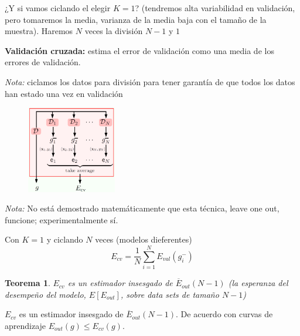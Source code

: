 \documentclass[11pt,a4paper]{article}
\newtheorem{theorem}{Teorema}
\theoremstyle{definition}
\begin{document}
	¿Y si vamos ciclando el elegir $K=1$? (tendremos alta variabilidad en validación, pero tomaremos la media, varianza de la media baja con el tamaño de la muestra). Haremos $N$ veces la división $N-1$ y $1$
	
	\textbf{Validación cruzada:} estima el error de validación como una media de los errores de validación.
	
	\textit{Nota:} ciclamos los datos para división para tener garantía de que todos los datos han estado una vez en validación
	
	\begin{figure}[H]
		\centering
		\includegraphics[width=0.35\textwidth]{images/leave_one_out}
		\caption{}
	\end{figure}
	\textit{Nota:} No está demostrado matemáticamente que esta técnica, leave one out, funcione; experimentalmente sí.
	
	Con $K=1$ y ciclando $N$ veces (modelos dieferentes)
	$$E_{cv}=\frac{1}{N}\sum_{i=1}^N E_{val}(g_i^-)$$
	\begin{theorem}
		$E_{cv}$ es un estimador insesgado de $\overline{E}_{out}(N-1)$ (la esperanza del desempeño del modelo, $E[E_{out}]$, sobre data sets de tamaño $N-1$)
	\end{theorem}
	$E_{cv}$ es un estimador insesgado de $\overline{E}_{out}(N-1)$. De acuerdo con curvas de aprendizaje $E_{out}(g)\leq E_{cv}(g)$.
	
\end{document}
